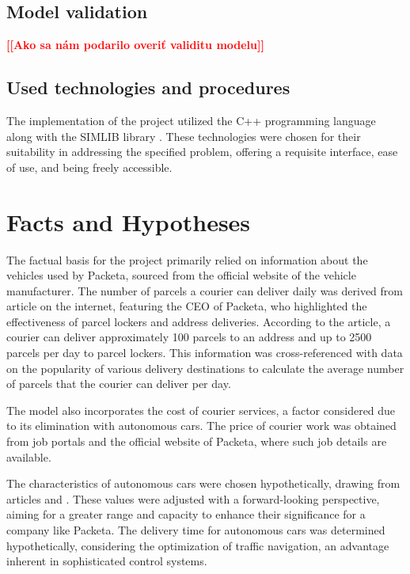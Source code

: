\documentclass[a4paper, 11pt, a4paper]{article}
\newcommand{\todo}[1]{\textcolor{red}{\textbf{[[#1]]}}}
\begin{document}
\subsection{Model validation}

\noindent\todo{Ako sa nám podarilo overiť validitu modelu}


\subsection{Used technologies and procedures}

The implementation of the project utilized the C++ programming language along with the SIMLIB library \cite{SIMLIB}.
These technologies were chosen for their suitability in addressing the specified problem, offering a requisite interface,
ease of use, and being freely accessible.


\section{Facts and Hypotheses}

The factual basis for the project primarily relied on information about the vehicles used by Packeta, sourced from the official
website of the vehicle manufacturer. The number of parcels a courier can deliver daily was derived from article \cite{parcels.num} on the internet,
featuring the CEO of Packeta, who highlighted the effectiveness of parcel lockers and address deliveries. According to the article,
a courier can deliver approximately 100 parcels to an address and up to 2500 parcels per day to parcel lockers. This information was
cross-referenced with data on the popularity of various delivery destinations \cite{delivery.percentage} to calculate the average number of
parcels that the courier can deliver per day.

The model also incorporates the cost of courier services, a factor considered due to its elimination with autonomous cars.
The price of courier work was obtained from job portals and the official website of Packeta, where such job details are available.

The characteristics of autonomous cars were chosen hypothetically, drawing from articles \cite{autonomous.emissions} and \cite{autonomous.models}. These values were adjusted with a
forward-looking perspective, aiming for a greater range and capacity to enhance their significance for a company like Packeta. The delivery
time for autonomous cars was determined hypothetically, considering the optimization of traffic navigation, an advantage inherent in sophisticated
control systems.
\end{document}
